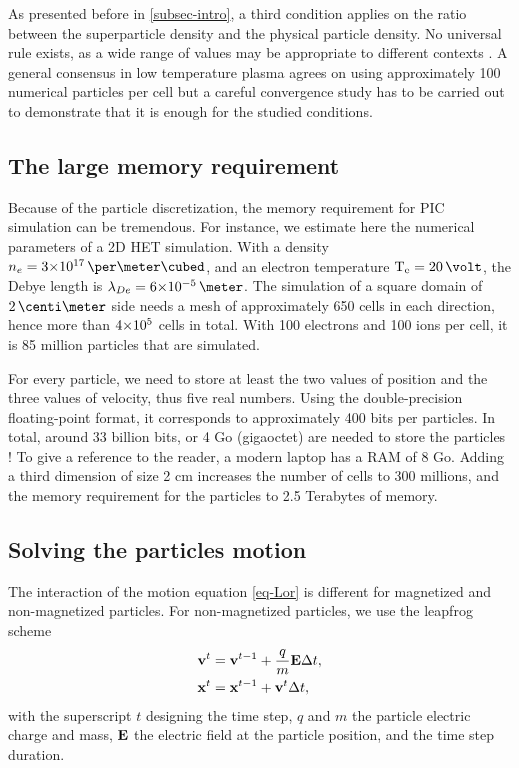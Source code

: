     As presented before in \cref{subsec-intro}, a third condition applies on the ratio between the superparticle density and the physical particle density. 
    No universal rule exists, as a wide range of values may be appropriate to different contexts \citep{turner2006,turner2013}.
    A general consensus in low temperature plasma agrees on using approximately 100 numerical particles per cell but a careful convergence study has to be carried out to demonstrate that it is enough for the studied conditions.
    
    \subsection{The large memory requirement}
    Because of the particle discretization, the memory requirement for \ac{PIC} simulation can be tremendous.
    For instance, we estimate here the numerical parameters of a \acs{2D} \ac{HET} simulation.
    With a density $n_e = \sn{3}{17}\,\per\meter\cubed$, and an electron temperature $\Te=20\,\volt$, the Debye length is $\lde=\sn{6}{-5}\,\meter$.
    The simulation of a square domain of $2\,\centi\meter$ side needs a mesh of approximately 650 cells in each direction, hence more than ${{4}{\times}10^{5}}$ cells in total.
    With 100 electrons and 100 ions per cell, it is 85 million particles that are simulated.
    
    For every particle, we need to store at least the two values of position and the three values of velocity, thus five real numbers.
    Using the double-precision floating-point format, it corresponds to approximately 400 bits per particles.
    In total, around 33 billion bits, or 4 Go (gigaoctet) are needed to store the particles ! 
    To give a reference to the reader, a modern laptop has a RAM of 8 Go.
    Adding a third dimension of size 2 cm increases the number of cells to 300 millions, and the memory requirement for the particles to 2.5 Terabytes of memory.
    
    
    \subsection{Solving the particles motion}
    The interaction of the motion equation \cref{eq-Lor} is different for magnetized and non-magnetized particles.
    For non-magnetized particles, we use the leapfrog scheme \cite{birdsall1991}
    \begin{align}\label{eq-leapfrog}
      {\mathbf v}^t &= {\mathbf v}^{t-1} + \frac{q}{m} {\mathbf E} \Delta t, \\
      {\mathbf x}^t &= {\mathbf x}^{t-1} + {\mathbf v}^t \Delta t, \label{eq-leapfrogtwo}
    \end{align}
    with the superscript $t$ designing the time step, $q$ and $m$ the particle electric charge and mass, ${\mathbf E}$ the electric field at the particle position, and \dt the time step duration.

